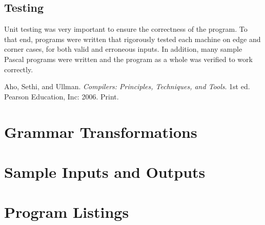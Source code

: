 \documentclass[titlepage]{article}
\begin{document}
		\subsection{Testing}
		Unit testing was very important to ensure the correctness of the program. To that end, programs were written that rigorously tested each machine on edge and corner cases, for both valid and erroneous inputs. In addition, many sample Pascal programs were written and the program as a whole was verified to work correctly.

	\begin{thebibliography}{9}
			Aho, Sethi, and Ullman.
			\emph{Compilers: Principles, Techniques, and Tools}.
			1st ed.
			Pearson Education, Inc: 2006. Print.
	\end{thebibliography}
	\appendix
	\section{Grammar Transformations}
	\section{Sample Inputs and Outputs}
	\section{Program Listings}
\end{document}
